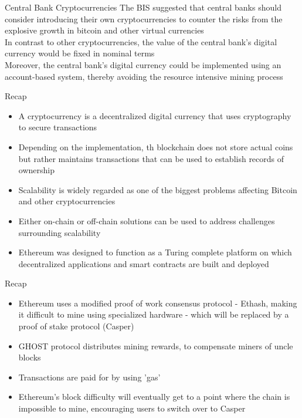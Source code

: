 \documentclass[10pt]{beamer}
\begin{document}

\begin{frame}{Central Bank Cryptocurrencies}
	The BIS suggested that central banks should consider introducing their own cryptocurrencies to counter the risks from the explosive growth in bitcoin and other virtual currencies\\ \vspace{3mm}
	In contrast to other cryptocurrencies, the value of the central bank's digital currency would be fixed in nominal terms\\ \vspace{3mm}
	Moreover, the central bank's digital currency could be implemented using an account-based system, thereby avoiding the resource intensive mining process
\end{frame}


\begin{frame}{Recap}
	\begin{itemize}
		\item A cryptocurrency is a decentralized digital currency that uses cryptography to secure transactions
		\item Depending on the implementation, th blockchain does not store actual coins but rather maintains transactions that can be used to establish records of ownership
		\item Scalability is widely regarded as one of the biggest problems affecting Bitcoin and other cryptocurrencies
		\item Either on-chain or off-chain solutions can be used to address challenges surrounding scalability
		\item Ethereum was designed to function as a Turing complete platform on which decentralized applications and smart contracts are built and deployed
	\end{itemize}
\end{frame}


\begin{frame}{Recap}
	\begin{itemize}
		\item Ethereum uses a modified proof of work consensus protocol - Ethash, making it difficult to mine using specialized hardware - which will be replaced by a proof of stake protocol (Casper)
		\item GHOST protocol distributes mining rewards, to compensate miners of uncle blocks
		\item Transactions are paid for by using 'gas'
		\item Ethereum's block difficulty will eventually get to a point where the chain is impossible to mine, encouraging users to switch over to Casper
	\end{itemize}
\end{frame}
\end{document}
